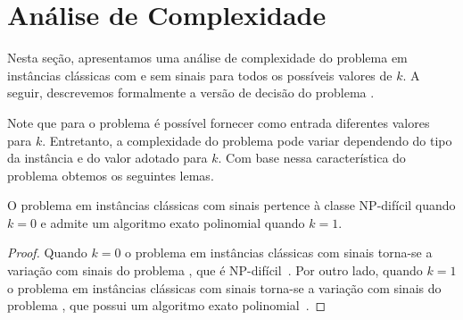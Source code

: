 \section{Análise de Complexidade}

Nesta seção, apresentamos uma análise de complexidade do problema \SbPRT{} em instâncias clássicas com e sem sinais para todos os possíveis valores de $k$. A seguir, descrevemos formalmente a versão de decisão do problema \SbPRT{}.

\begin{decision}
\end{decision}

Note que para o problema \SbPRT{} é possível fornecer como entrada diferentes valores para $k$. Entretanto, a complexidade do problema pode variar dependendo do tipo da instância e do valor adotado para $k$. Com base nessa característica do problema obtemos os seguintes lemas.


\begin{lemma}
O problema \SbPRT{} em instâncias clássicas com sinais pertence à classe NP-difícil quando $k=0$ e admite um algoritmo exato polinomial quando $k=1$.
\end{lemma}
\begin{proof}
Quando $k=0$ o problema \SbPRT{} em instâncias clássicas com sinais torna-se a variação com sinais do problema \SbRT{}, que é NP-difícil~\cite{2019b-oliveira-etal}. Por outro lado, quando $k=1$ o problema \SbPRT{} em instâncias clássicas com sinais torna-se a variação com sinais do problema \SbR{}, que possui um algoritmo exato polinomial~\cite{1999-hannenhalli-pevzner}.
\end{proof}

